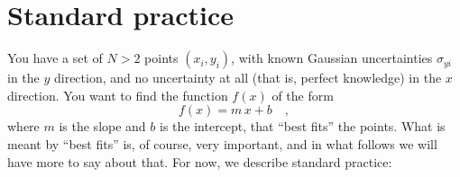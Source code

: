\documentclass[12pt,twoside]{article}
\begin{document}
\section{Standard practice}\label{sec:standard}

You have a set of $N>2$ points $(x_i,y_i)$, with known Gaussian
uncertainties $\sigma_{yi}$ in the $y$ direction, and no uncertainty
at all (that is, perfect knowledge) in the $x$ direction.  You want to
find the function $f(x)$ of the form
\begin{equation}\label{eq:fofx}
f(x) = m\,x + b \quad ,
\end{equation}
where $m$ is the slope and $b$ is the intercept, that ``best fits''
the points.  What is meant by ``best fits'' is, of course, very
important, and in what follows we will have more to say about
that. For now, we describe standard practice:
\end{document}
